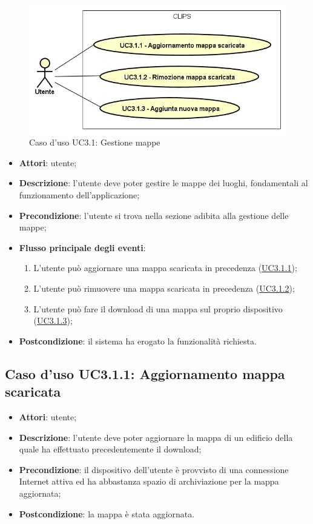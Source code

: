 \documentclass[../AnalisiDeiRequisiti.tex]{subfiles}
\begin{document}
        \begin{figure}[!h]
            \centering
            \includegraphics[scale=0.95, width=\textwidth]{img/UC3-1.png}
            \caption{Caso d'uso UC3.1: Gestione mappe}\label{fig:UC3.1} 
        \end{figure}
\begin{itemize}
\item \textbf{Attori}: utente;
\item \textbf{Descrizione}: l'utente deve poter gestire le mappe dei luoghi, fondamentali al funzionamento dell'applicazione; 
      \item \textbf{Precondizione}: l'utente si trova nella sezione adibita alla gestione delle mappe;

        \item \textbf{Flusso principale degli eventi}:
          \begin{enumerate}
          \item L'utente può aggiornare una mappa scaricata in precedenza (\hyperlink{UC3.1.1}{UC3.1.1});
          \item L'utente può rimuovere una mappa scaricata in precedenza (\hyperlink{UC3.1.2}{UC3.1.2});
          \item L'utente può fare il download di una mappa sul proprio dispositivo (\hyperlink{UC3.1.3}{UC3.1.3});

      \end{enumerate}
    \item \textbf{Postcondizione}: il sistema ha erogato la funzionalità richiesta.
  \end{itemize}
\hypertarget{UC3.1.1}{}
\subsection{Caso d'uso UC3.1.1: Aggiornamento mappa scaricata}
\begin{itemize}
\item \textbf{Attori}: utente;
\item \textbf{Descrizione}: l'utente deve poter aggiornare la mappa di un edificio della quale ha effettuato precedentemente il download; 
      \item \textbf{Precondizione}: il dispositivo dell'utente è provvisto di una connessione Internet attiva ed ha abbastanza spazio di archiviazione per la mappa aggiornata;
    \item \textbf{Postcondizione}: la mappa è stata aggiornata.
  \end{itemize}
\hypertarget{UC3.1.2}{}
\end{document}
